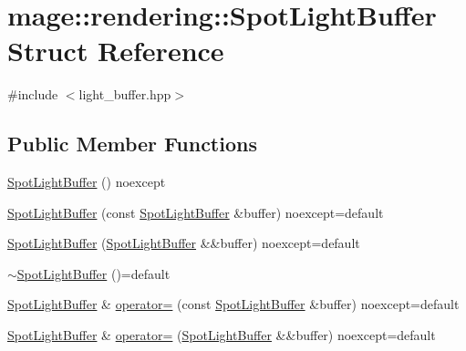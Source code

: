 \hypertarget{structmage_1_1rendering_1_1_spot_light_buffer}{}\section{mage\+:\+:rendering\+:\+:Spot\+Light\+Buffer Struct Reference}
\label{structmage_1_1rendering_1_1_spot_light_buffer}


{\ttfamily \#include $<$light\+\_\+buffer.\+hpp$>$}

\subsection*{Public Member Functions}
\begin{DoxyCompactItemize}
\item 
\hyperlink{structmage_1_1rendering_1_1_spot_light_buffer_a603e2c40ae924a2183f24604297715aa}{Spot\+Light\+Buffer} () noexcept
\item 
\hyperlink{structmage_1_1rendering_1_1_spot_light_buffer_a091924b026f081f1612138806ff1e107}{Spot\+Light\+Buffer} (const \hyperlink{structmage_1_1rendering_1_1_spot_light_buffer}{Spot\+Light\+Buffer} \&buffer) noexcept=default
\item 
\hyperlink{structmage_1_1rendering_1_1_spot_light_buffer_a36fe774118a2b1d0e48ba89e74d09886}{Spot\+Light\+Buffer} (\hyperlink{structmage_1_1rendering_1_1_spot_light_buffer}{Spot\+Light\+Buffer} \&\&buffer) noexcept=default
\item 
\hyperlink{structmage_1_1rendering_1_1_spot_light_buffer_ab1fecb64be60d395b0bc5d3e6cc4072a}{$\sim$\+Spot\+Light\+Buffer} ()=default
\item 
\hyperlink{structmage_1_1rendering_1_1_spot_light_buffer}{Spot\+Light\+Buffer} \& \hyperlink{structmage_1_1rendering_1_1_spot_light_buffer_a6bfd4e7dc9b8a7d3cd5206c9becb91cf}{operator=} (const \hyperlink{structmage_1_1rendering_1_1_spot_light_buffer}{Spot\+Light\+Buffer} \&buffer) noexcept=default
\item 
\hyperlink{structmage_1_1rendering_1_1_spot_light_buffer}{Spot\+Light\+Buffer} \& \hyperlink{structmage_1_1rendering_1_1_spot_light_buffer_ab3d50a0d08d284577b0e43b05c34e287}{operator=} (\hyperlink{structmage_1_1rendering_1_1_spot_light_buffer}{Spot\+Light\+Buffer} \&\&buffer) noexcept=default
\end{DoxyCompactItemize}
